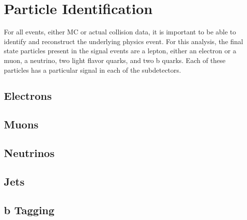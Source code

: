 \section{Particle Identification}
For all events, either MC or actual collision data, it is important to be able to identify and reconstruct the underlying physics event. For this analysis, the final state particles present in the signal events are a lepton, either an electron or a muon, a neutrino, two light flavor quarks, and two b quarks. Each of these particles has a particular signal in each of the subdetectors.  
\subsection{Electrons}
\subsection{Muons}
\subsection{Neutrinos}
\subsection{Jets}
\subsection{b Tagging}\label{ssec:btag}





